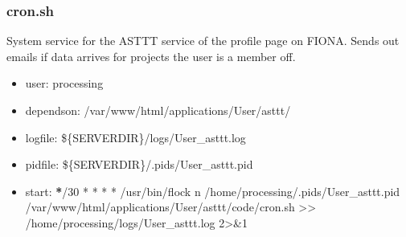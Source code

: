 \documentclass[letterpaper,10pt,english]{sphinxmanual}
\begin{document}
\subsubsection{cron.sh}
\label{\detokenize{Architecture/scripts/cron:cron-sh}}\label{\detokenize{Architecture/scripts/cron::doc}}
\sphinxAtStartPar
System service for the ASTTT service of the profile page on FIONA. Sends out emails if data arrives for projects the user is a member off.
\begin{itemize}
\item {} 
\sphinxAtStartPar
user: processing

\item {} 
\sphinxAtStartPar
depends\sphinxhyphen{}on:
\sphinxhyphen{} /var/www/html/applications/User/asttt/

\item {} 
\sphinxAtStartPar
log\sphinxhyphen{}file:
\sphinxhyphen{} \$\{SERVERDIR\}/logs/User\_asttt.log

\item {} 
\sphinxAtStartPar
pid\sphinxhyphen{}file: \$\{SERVERDIR\}/.pids/User\_asttt.pid

\item {} 
\sphinxAtStartPar
start:
{\color{red}\bfseries{}*}/30 * * * * /usr/bin/flock \sphinxhyphen{}n /home/processing/.pids/User\_asttt.pid /var/www/html/applications/User/asttt/code/cron.sh \textgreater{}\textgreater{} /home/processing/logs/User\_asttt.log 2\textgreater{}\&1

\end{itemize}

\sphinxstepscope
\end{document}
